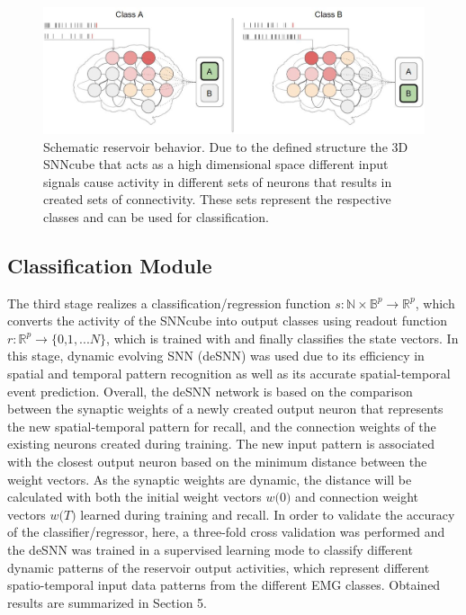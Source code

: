 \documentclass[journal,article,submit,moreauthors,pdftex,10pt,a4paper]{Definitions/mdpi}
\begin{document}
\begin{figure}[H]
    \centering
    \includegraphics [width=0.9\linewidth]{neuCUBE.png}
    \caption{Schematic reservoir behavior. Due to the defined structure the 3D SNNcube that acts as a high dimensional space different input signals cause activity in different sets of neurons that results in created sets of connectivity. These sets represent the respective classes and can be used for classification.
}
    \label{FIG:neuCUBE.png}
\end{figure}

\subsection{Classification Module}
The third stage realizes a classification/regression function $\mathrm{\textit{s}} : \mathbb{N} \times \mathbb{B}^\mathrm{\textit{p}} \rightarrow \mathbb{R}^\mathrm{\textit{p}}$, which converts the activity of the SNNcube into output classes using readout function $\mathrm{\textit{r}} : \mathbb{R}^\mathrm{\textit{p}} \rightarrow \{\textit{0,1},...\mathrm{\textit{N}}\}$, which is trained with and finally classifies the state vectors. In this stage, dynamic evolving SNN (deSNN) \cite{40} was used due to its efficiency in spatial and temporal pattern recognition as well as its accurate spatial-temporal event prediction. Overall, the deSNN network is based on the comparison between the synaptic weights of a newly created output neuron that represents the new spatial-temporal pattern for recall, and the connection weights of the existing neurons created during training. The new input pattern is associated with the closest output neuron based on the minimum distance between the weight vectors. As the synaptic weights are dynamic, the distance will be calculated with both the initial weight vectors $\textit{w(0)}$ and connection weight vectors $\textit{w(T)}$ learned during training and recall. 
In order to validate the accuracy of the classifier/regressor, here, a three-fold cross validation was performed and the deSNN was trained in a supervised learning mode to classify different dynamic patterns of the reservoir output activities, which represent different spatio-temporal input data patterns from the different EMG classes. Obtained results are summarized in Section 5. 
\end{document}

